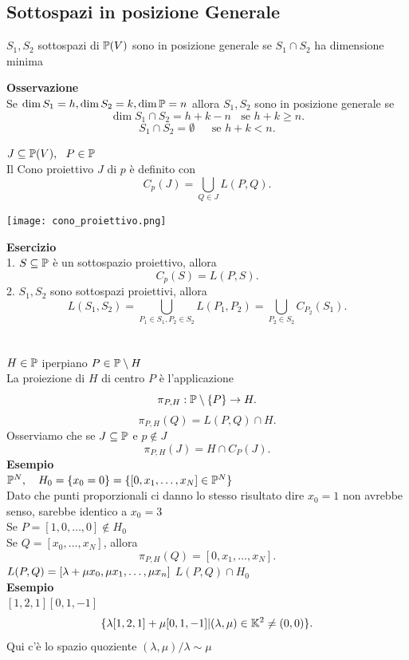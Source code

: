\documentclass[12px]{article}
\begin{document}
	\subsection{Sottospazi in posizione Generale}
	\begin{defi}
		$S_1, S_2$ sottospazi di $\mathbb{P}(V)$ sono in posizione generale se $S_1\cap S_2$ ha dimensione minima
	\end{defi}
	\textbf{Osservazione}\\
	Se $\dim S_1 = h, \dim S_2 = k, \dim\mathbb{P} =n$ allora $S_1,S_2$ sono in posizione generale se 
	\[
		\dim S_1\cap S_2 = h + k - n \ \ \ \ \text{se } h+k\geq n
	.\]\[
	S_1\cap S_2 = \emptyset \ \ \ \ \ \ \ \text{se } h + k <n
.\]
\begin{defi}
$J\subseteq\mathbb{P}(V), \ \ P\in \mathbb{P}$\\
Il Cono proiettivo  $J$ di $p$ è definito con 
\[
	C_p(J) = \bigcup_{Q\in J}L(P,Q)
.\] 
\end{defi}
\begin{center}
\texttt{[image: cono\_proiettivo.png]}\\
\end{center}
\textbf{Esercizio}\\
1. $S\subseteq\mathbb{P}$ è un sottospazio proiettivo, allora 
\[
 C_p(S) = L(P,S) 
.\] 
2. $S_1, S_2$ sono sottospazi proiettivi, allora 
\[
	L(S_1,S_2) = \bigcup_{P_1\in S_1, P_2\in S_2} L(P_1,P_2) = \bigcup_{P_2\in S_2} C_{P_2}(S_1)
.\] 
\ \\ \hline \ \\
$H\in \mathbb{P}$ iperpiano $P\in \mathbb{P}\setminus H$\\
La proiezione di  $H$ di centro $P$ è l'applicazione
\[
	\pi_{P,H}:\mathbb{P}\setminus\{P\} \rightarrow H
.\] 
\[
	\pi_{P,H}(Q) = L(P,Q) \cap H
.\] 
Osserviamo che se $J\subseteq \mathbb{P}$ e $p\notin J$
 \[
	 \pi_{P,H}(J) = H\cap C_P(J)
.\] 
\textbf{Esempio}\\
$\mathbb{P}^N, \ \ \ H_0 = \{x_0=0\} = \{[0,x_1,\ldots,x_N]\in \mathbb{P}^N\}$\\
Dato che punti proporzionali ci danno lo stesso risultato dire $x_0 = 1$ non avrebbe senso, sarebbe identico a $x_0=3$\\[10px]
Se $P = [1,0,\ldots,0]\notin H_0$\\
Se $Q = [x_0,\ldots,x_N]$, allora
\[
	\pi_{P,H}(Q) = [0,x_1,\ldots,x_N]
.\] 
$L(P,Q) = [ \lambda + \mu x_0, \mu x_1,\ldots, \mu x_n]\\$
$L(P,Q)\cap H_0$\\
\textbf{Esempio}\\
$[1,2,1] [0,1,-1]$\\
\[
	\{ \lambda [1,2,1] + \mu [0,1,-1] | ( \lambda,\mu)\in \mathbb{K}^2 \neq(0,0)\}
.\] 
Qui c'è lo spazio quoziente $( \lambda,\mu) / \lambda \sim \mu $
\ \\ \hline \ \\ 
\end{document}
